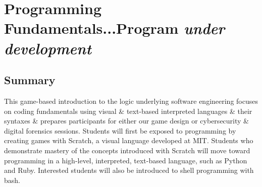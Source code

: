 \documentclass[letterpaper,10pt,english]{sphinxmanual}
\begin{document}
\chapter{Programming Fundamentals...Program \emph{under development}}
\label{programming:programming-fundamentals-program-under-development}\label{programming::doc}

\section{Summary}
\label{programming:summary}
This game-based introduction to the logic underlying software engineering focuses on coding fundamentals using visual \& text-based interpreted languages \& their syntaxes \& prepares participants for either our game design or cybersecurity \& digital forensics sessions. Students will first be exposed to programming by creating games with Scratch, a visual language developed at MIT. Students who demonstrate mastery of the concepts introduced with Scratch will move toward programming in a high-level, interpreted, text-based language, such as Python and Ruby. Interested students will also be introduced to shell programming with bash.
\end{document}
